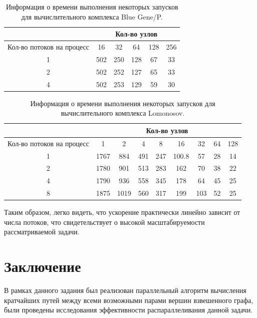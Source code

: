 \documentclass[a4paper,12pt]{report}
\begin{document}
			\begin{table}[H]
				\centering
				\begin{tabular}{|c||c|c|c|c|c|}
					\hline
					& \multicolumn{5}{c|}{Кол-во узлов}\\
					\hline
					Кол-во потоков на процесс & 16	&32&	64&	128&	256\\
					\hline
					\hline
					1 & 502	& 250	& 128&	67&	33\\
					\hline
					2				&	502 &	252 &	127 &	65 &	33\\
					\hline
					4			&		502 &	253 &	129 &	59 & 30\\					
					\hline
					
				\end{tabular}
				\caption{Информация о времени выполнения некоторых запусков для вычислительного комплекса Blue Gene/P.}
				\label{res}
			\end{table}

			\begin{table}[H]
				\centering
				\begin{tabular}{|c||c|c|c|c|c|c|c|c|}
					\hline
					& \multicolumn{8}{c|}{Кол-во узлов}\\
					\hline
					Кол-во потоков на процесс & 1	&2& 4&	8&	16 & 32 & 64 & 128\\
					\hline
					\hline
1&	1767	&884	&491&	247 &	100.8 &	57	&28&	14\\
					\hline
2	& 1780&	901 &	513 &	283 &	162 &	70 &	38&	22\\
					\hline
4	& 1790&	936 &	558 &	345&	 	178 &	64&	45&	25\\
					\hline
8	& 1875 &	1019 &	560 &	317 &	199 &	103 &	52 &	25\\					
					\hline
					
				\end{tabular}
				\caption{Информация о времени выполнения некоторых запусков для вычислительного комплекса Lomonosov.}
				\label{res}
			\end{table}


	\par Таким образом, легко видеть, что ускорение практически линейно зависит от числа потоков, что свидетельствует о  высокой масштабируемости рассматриваемой задачи.

\section*{Заключение}
	\par В рамках данного задания был реализован параллельный алгоритм вычисления кратчайших путей между всеми возможными парами вершин взвешенного графа, были проведены исследования эффективности распараллеливания данной задачи.
	
\end{document}
